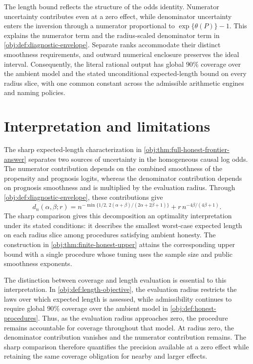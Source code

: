 \documentclass[11pt]{article}
\begin{document}
The length bound reflects the structure of the odds identity. Numerator uncertainty contributes even at a zero effect, while denominator uncertainty enters the inversion through a numerator proportional to \(\exp\{\theta(P)\}-1\). This explains the numerator term and the radius-scaled denominator term in \cref{obj:def:diagnostic-envelope}. Separate ranks accommodate their distinct smoothness requirements, and outward numerical enclosure preserves the ideal interval. Consequently, the literal rational output has global \(90\%\) coverage over the ambient model and the stated unconditional expected-length bound on every radius slice, with one common constant across the admissible arithmetic engines and naming policies.


\section{Interpretation and limitations}

The sharp expected-length characterization in \cref{obj:thm:full-honest-frontier-answer} separates two sources of uncertainty in the homogeneous causal log odds. The numerator contribution depends on the combined smoothness of the propensity and prognosis logits, whereas the denominator contribution depends on prognosis smoothness and is multiplied by the evaluation radius. Through \cref{obj:def:diagnostic-envelope}, these contributions give
\[
d_n(\alpha,\beta;r)
=
n^{-\min\{1/2,\,2(\alpha+\beta)/(2\alpha+2\beta+1)\}}
+
r\,n^{-4\beta/(4\beta+1)}.
\]
The sharp comparison gives this decomposition an optimality interpretation under its stated conditions: it describes the smallest worst-case expected length on each radius slice among procedures satisfying ambient honesty. The construction in \cref{obj:thm:finite-honest-upper} attains the corresponding upper bound with a single procedure whose tuning uses the sample size and public smoothness exponents.

The distinction between coverage and length evaluation is essential to this interpretation. In \cref{obj:def:length-objective}, the evaluation radius restricts the laws over which expected length is assessed, while admissibility continues to require global \(90\%\) coverage over the ambient model in \cref{obj:def:honest-procedures}. Thus, as the evaluation radius approaches zero, the procedure remains accountable for coverage throughout that model. At radius zero, the denominator contribution vanishes and the numerator contribution remains. The sharp comparison therefore quantifies the precision available at a zero effect while retaining the same coverage obligation for nearby and larger effects.
\end{document}
